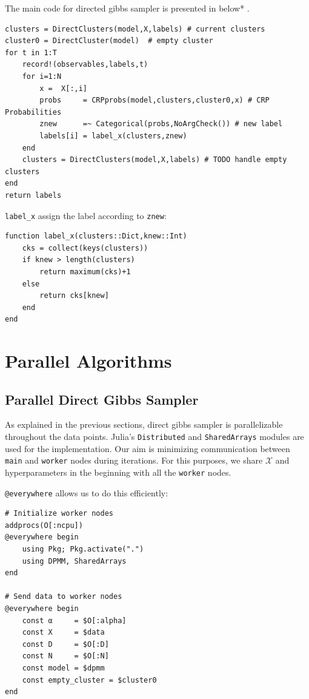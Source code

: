 \documentclass[a4paper]{article}
\begin{document}
The main code for directed gibbs sampler is presented in below* .
\begin{lstlisting}
clusters = DirectClusters(model,X,labels) # current clusters
cluster0 = DirectCluster(model)  # empty cluster
for t in 1:T
    record!(observables,labels,t)
    for i=1:N
        x =  X[:,i]
        probs     = CRPprobs(model,clusters,cluster0,x) # CRP Probabilities
        znew      =~ Categorical(probs,NoArgCheck()) # new label
        labels[i] = label_x(clusters,znew)
    end
    clusters = DirectClusters(model,X,labels) # TODO handle empty clusters
end
return labels
\end{lstlisting}

\texttt{label\_x} assign the label according to \texttt{znew}:
\begin{lstlisting}[linewidth=11cm]
function label_x(clusters::Dict,knew::Int)
    cks = collect(keys(clusters))
    if knew > length(clusters)
        return maximum(cks)+1
    else
        return cks[knew]
    end
end
\end{lstlisting}


\section{Parallel Algorithms}


\subsection{Parallel Direct Gibbs Sampler}

As explained in the previous sections, direct gibbs sampler is
parallelizable throughout the data points. Julia's \texttt{Distributed}
and \texttt{SharedArrays} modules are used for the implementation. Our
aim is minimizing communication between \texttt{main} and
\texttt{worker} nodes during iterations. For this purposes, we share
\(\mathcal{X}\) and hyperparameters in the beginning with all the
\texttt{worker} nodes.

\texttt{@everywhere} allows us to do this efficiently:
\begin{lstlisting}
# Initialize worker nodes
addprocs(O[:ncpu])
@everywhere begin
    using Pkg; Pkg.activate(".")
    using DPMM, SharedArrays
end

# Send data to worker nodes
@everywhere begin
    const α     = $O[:alpha]
    const X     = $data
    const D     = $O[:D]
    const N     = $O[:N]
    const model = $dpmm
    const empty_cluster = $cluster0
end
\end{lstlisting}
\end{document}
